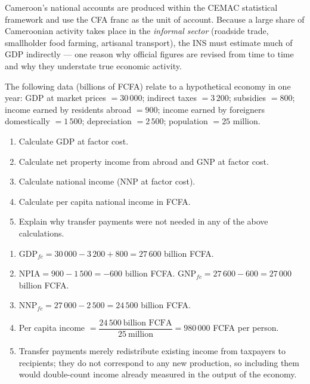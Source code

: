 \documentclass[11pt]{article}
\begin{document}
\begin{savaistu}
Cameroon's national accounts are produced within the CEMAC statistical framework and use the CFA franc as the unit of account. Because a large share of Cameroonian activity takes place in the \emph{informal sector} (roadside trade, smallholder food farming, artisanal transport), the INS must estimate much of GDP indirectly --- one reason why official figures are revised from time to time and why they understate true economic activity.
\end{savaistu}

\begin{exercice}[Practice]
The following data (billions of FCFA) relate to a hypothetical economy in one year: GDP at market prices $= 30\,000$; indirect taxes $= 3\,200$; subsidies $= 800$; income earned by residents abroad $= 900$; income earned by foreigners domestically $= 1\,500$; depreciation $= 2\,500$; population $= 25$ million.
\begin{enumerate}
\item Calculate GDP at factor cost.
\item Calculate net property income from abroad and GNP at factor cost.
\item Calculate national income (NNP at factor cost).
\item Calculate per capita national income in FCFA.
\item Explain why transfer payments were not needed in any of the above calculations.
\end{enumerate}
\end{exercice}

\begin{corrige}[Exercise 1]
\begin{enumerate}
\item $\text{GDP}_{fc} = 30\,000 - 3\,200 + 800 = 27\,600$ billion FCFA.
\item $\text{NPIA} = 900 - 1\,500 = -600$ billion FCFA. $\text{GNP}_{fc} = 27\,600 - 600 = 27\,000$ billion FCFA.
\item $\text{NNP}_{fc} = 27\,000 - 2\,500 = 24\,500$ billion FCFA.
\item Per capita income $= \dfrac{24\,500\ \text{billion FCFA}}{25\ \text{million}} = 980\,000$ FCFA per person.
\item Transfer payments merely redistribute existing income from taxpayers to recipients; they do not correspond to any new production, so including them would double-count income already measured in the output of the economy.
\end{enumerate}
\end{corrige}
\end{document}
